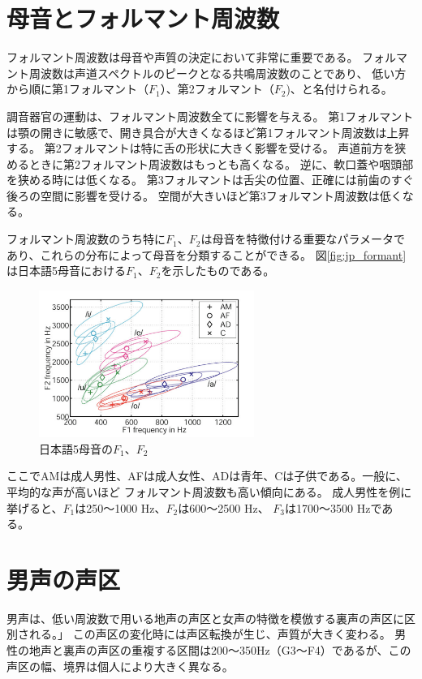 \documentclass[10.5ptj,a4j,dvipdfmx,uplatex, oneside, openany, report, draft]{jsbook}%
\begin{document}
\section{母音とフォルマント周波数}
フォルマント周波数は母音や声質の決定において非常に重要である。
フォルマント周波数は声道スペクトルのピークとなる共鳴周波数のことであり、
低い方から順に第1フォルマント（$F_1$）、第2フォルマント（$F_2$)、と名付けられる。

調音器官の運動は、フォルマント周波数全てに影響を与える。
第1フォルマントは顎の開きに敏感で、開き具合が大きくなるほど第1フォルマント周波数は上昇する。
第2フォルマントは特に舌の形状に大きく影響を受ける。
声道前方を狭めるときに第2フォルマント周波数はもっとも高くなる。
逆に、軟口蓋や咽頭部を狭める時には低くなる。
第3フォルマントは舌尖の位置、正確には前歯のすぐ後ろの空間に影響を受ける。
空間が大きいほど第3フォルマント周波数は低くなる。

フォルマント周波数のうち特に$F_1$、$F_2$は母音を特徴付ける重要なパラメータであり、これらの分布によって母音を分類することができる\cite{japanese_vowels}。
図\ref{fig:jp_formant}は日本語5母音における$F_1$、$F_2$を示したものである。

\begin{figure}[htbp]
    \begin{center}
      \includegraphics[clip,width=7.0cm]{5母音.png}
      \caption{日本語5母音の$F_1$、$F_2$\cite{japanese_vowels}}
      \label{jp_formant}
    \end{center}
\end{figure}
ここでAMは成人男性、AFは成人女性、ADは青年、Cは子供である。一般に、平均的な声が高いほど
フォルマント周波数も高い傾向にある。
成人男性を例に挙げると、$F_1$は250〜1000 \si{Hz}、$F_2$は600〜2500 \si{Hz}、
$F_3$は1700〜3500 \si{Hz}である\cite{science}。


\section{男声の声区}
男声は、低い周波数で用いる地声の声区と女声の特徴を模倣する裏声の声区に区別される\cite{science}。」
この声区の変化時には声区転換が生じ、声質が大きく変わる。
男性の地声と裏声の声区の重複する区間は200〜350Hz（G3〜F4）であるが、この声区の幅、境界は個人により大きく異なる。
\end{document}
